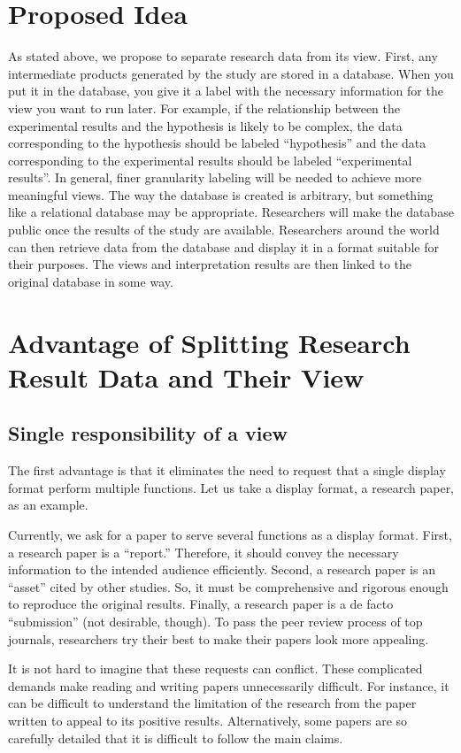 \documentclass{article}
\begin{document}
\section{Proposed Idea}
As stated above, we propose to separate research data from its view. First, any intermediate products generated by the study are stored in a database. When you put it in the database, you give it a label with the necessary information for the view you want to run later. For example, if the relationship between the experimental results and the hypothesis is likely to be complex, the data corresponding to the hypothesis should be labeled ``hypothesis'' and the data corresponding to the experimental results should be labeled ``experimental results''. In general, finer granularity labeling will be needed to achieve more meaningful views. The way the database is created is arbitrary, but something like a relational database may be appropriate. Researchers will make the database public once the results of the study are available. Researchers around the world can then retrieve data from the database and display it in a format suitable for their purposes. The views and interpretation results are then linked to the original database in some way.

\section{Advantage of Splitting Research Result Data and Their View}
\subsection{Single responsibility of a view}
The first advantage is that it eliminates the need to request that a single display format perform multiple functions. Let us take a display format, a research paper,  as an example. 

Currently, we ask for a paper to serve several functions as a display format. First, a research paper is a ``report.'' Therefore, it should convey the necessary information to the intended audience efficiently. Second, a research paper is an ``asset'' cited by other studies. So, it must be comprehensive and rigorous enough to reproduce the original results. Finally, a research paper is a de facto “submission” (not desirable, though). To pass the peer review process of top journals, researchers try their best to make their papers look more appealing.

It is not hard to imagine that these requests can conflict. These complicated demands make reading and writing papers unnecessarily difficult. For instance, it can be difficult to understand the limitation of the research from the paper written to appeal to its positive results. Alternatively, some papers are so carefully detailed that it is difficult to follow the main claims.
\end{document}
